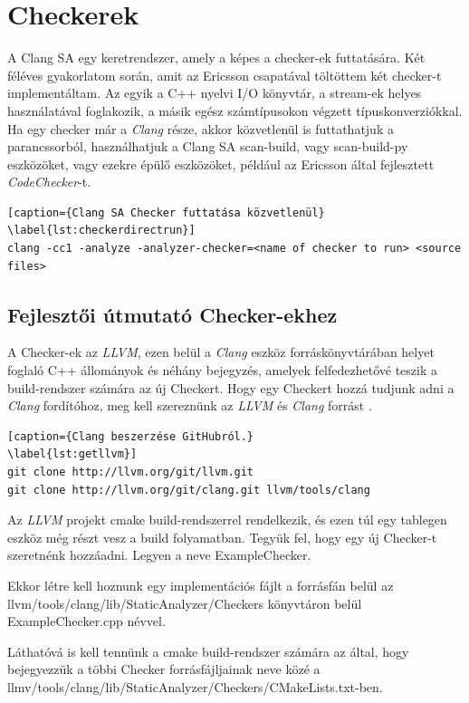 \documentclass[a4paper,12pt]{report}
\begin{document}
\chapter{Checkerek}
A Clang SA egy keretrendszer, amely a képes a checker-ek futtatására. Két féléves gyakorlatom során, amit az Ericsson csapatával töltöttem két checker-t implementáltam. Az egyik a C++ nyelvi I/O könyvtár, a stream-ek helyes használatával foglakozik, a másik egész számtípusokon végzett típuskonverziókkal.
Ha egy checker már a \emph{Clang} része, akkor közvetlenül is futtathatjuk a parancssorból, használhatjuk a Clang SA scan-build, vagy scan-build-py eszközöket, vagy ezekre épülő eszközöket, például az Ericsson által fejlesztett \emph{CodeChecker}-t.

\begin{lstlisting}[caption={Clang SA Checker futtatása közvetlenül}
\label{lst:checkerdirectrun}]
clang -cc1 -analyze -analyzer-checker=<name of checker to run> <source files>
\end{lstlisting}

\section{Fejlesztői útmutató Checker-ekhez}
A Checker-ek az \emph{LLVM}, ezen belül a \emph{Clang} eszköz forráskönyvtárában helyet foglaló C++ állományok és néhány bejegyzés, amelyek felfedezhetővé teszik a build-rendszer számára az új Checkert. Hogy egy Checkert hozzá tudjunk adni a \emph{Clang} fordítóhoz, meg kell szereznünk az \emph{LLVM} és \emph{Clang} forrást \cite{getllvmpage}.

\begin{lstlisting}[caption={Clang beszerzése GitHubról.}
\label{lst:getllvm}]
git clone http://llvm.org/git/llvm.git
git clone http://llvm.org/git/clang.git llvm/tools/clang
\end{lstlisting}

Az \emph{LLVM} projekt cmake build-rendszerrel rendelkezik, és ezen túl egy tablegen eszköz még részt vesz a build folyamatban. Tegyük fel, hogy egy új Checker-t szeretnénk hozzáadni. Legyen a neve ExampleChecker.

Ekkor létre kell hoznunk egy implementációs fájlt a forrásfán belül az llvm/tools/clang/lib/StaticAnalyzer/Checkers könyvtáron belül ExampleChecker.cpp névvel.

Láthatóvá is kell tennünk a cmake build-rendszer számára az által, hogy bejegyezzük a többi Checker forrásfájljainak neve közé a llmv/tools/clang/lib/StaticAnalyzer/Checkers/CMakeLists.txt-ben.
\end{document}
